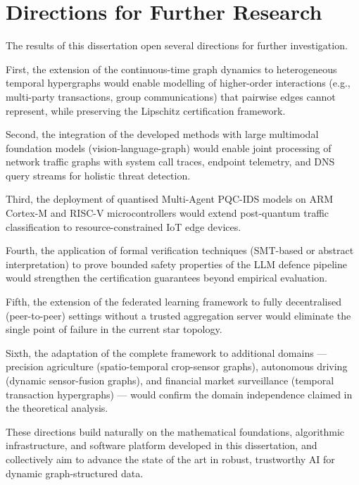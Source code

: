 \section*{Directions for Further Research}

The results of this dissertation open several directions for further investigation.

First, the extension of the continuous-time graph dynamics to heterogeneous temporal hypergraphs would enable modelling of higher-order interactions (e.g., multi-party transactions, group communications) that pairwise edges cannot represent, while preserving the Lipschitz certification framework.

Second, the integration of the developed methods with large multimodal foundation models (vision-language-graph) would enable joint processing of network traffic graphs with system call traces, endpoint telemetry, and DNS query streams for holistic threat detection.

Third, the deployment of quantised Multi-Agent PQC-IDS models on ARM Cortex-M and RISC-V microcontrollers would extend post-quantum traffic classification to resource-constrained IoT edge devices.

Fourth, the application of formal verification techniques (SMT-based or abstract interpretation) to prove bounded safety properties of the LLM defence pipeline would strengthen the certification guarantees beyond empirical evaluation.

Fifth, the extension of the federated learning framework to fully decentralised (peer-to-peer) settings without a trusted aggregation server would eliminate the single point of failure in the current star topology.

Sixth, the adaptation of the complete framework to additional domains --- precision agriculture (spatio-temporal crop-sensor graphs), autonomous driving (dynamic sensor-fusion graphs), and financial market surveillance (temporal transaction hypergraphs) --- would confirm the domain independence claimed in the theoretical analysis.

These directions build naturally on the mathematical foundations, algorithmic infrastructure, and software platform developed in this dissertation, and collectively aim to advance the state of the art in robust, trustworthy AI for dynamic graph-structured data.
